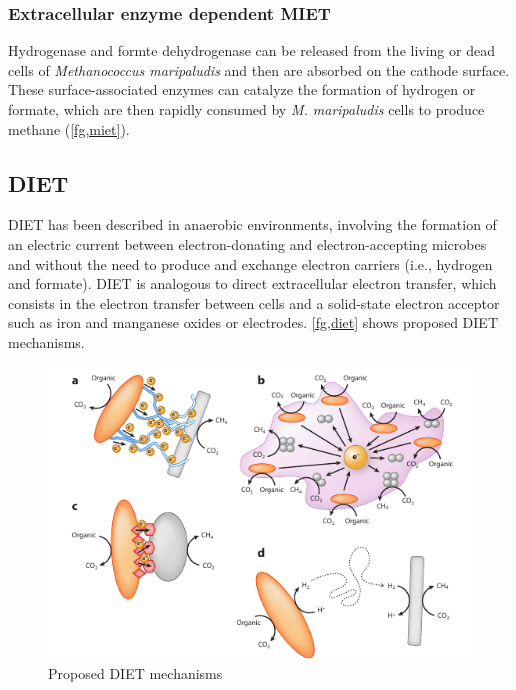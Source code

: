\documentclass[fontsize=12pt,headsepline=true, bibliography=totocnumbered, twoside]{scrbook} %
\begin{document}
 
\subsubsection{Extracellular enzyme dependent \ac{MIET}}


Hydrogenase and formte dehydrogenase can be released from the living or dead cells of \textit{Methanococcus maripaludis} and then are absorbed on the cathode surface. These surface-associated enzymes can catalyze the formation of hydrogen or formate, which are then rapidly consumed by \textit{M. maripaludis} cells to produce methane (\autoref{fg,miet})\citep{gao2021putative}.



\subsection[Direct interspecies electron transfer]{\acf{DIET}}


\acf{DIET} has been described in anaerobic environments, involving the 
formation of an electric current between electron-donating and electron-accepting
 microbes and without the need to produce and exchange 
 electron carriers (i.e., hydrogen and formate). DIET is analogous to direct 
 extracellular electron transfer, which consists in the electron transfer
  between cells and a solid-state electron acceptor such as iron and manganese 
  oxides or electrodes\citep{lovley2017syntrophy}. \autoref{fg,diet} shows proposed \ac{DIET} mechanisms.
  
  
  
\begin{figure}
\includegraphics[scale=0.7]{diet}
\caption[Proposed DIET mechanisms]{Proposed DIET mechanisms\citep{lovley2017syntrophy}}
\label{fg,diet}
\end{figure}  
  
\end{document}
